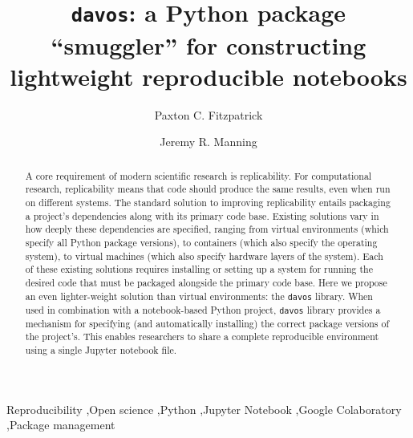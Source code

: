 \documentclass[preprint,12pt, a4paper]{elsarticle}
\begin{document}
\begin{frontmatter}

\title{\texttt{davos}: a Python package ``smuggler'' for constructing
  lightweight reproducible notebooks}
\author{Paxton C. Fitzpatrick}
\author{Jeremy R. Manning}
\address{Department of Psychological and Brain Sciences\\Dartmouth College, Hanover, NH 03755}


\begin{abstract}

A core requirement of modern scientific research is replicability.
For computational research, replicability means that code should
produce the same results, even when run on different systems.  The
standard solution to improving replicability entails packaging a
project's dependencies along with its primary code base.  Existing
solutions vary in how deeply these dependencies are specified, ranging
from virtual environments (which specify all Python package versions),
to containers (which also specify the operating system), to
virtual machines (which also specify hardware layers of the system).
Each of these existing solutions requires installing or setting up a
system for running the desired code that must be packaged alongside
the primary code base.  Here we propose an even lighter-weight
solution than virtual environments: the \texttt{davos} library.  When
used in combination with a notebook-based Python project, \texttt{davos}
library provides a mechanism for specifying (and automatically
installing) the correct package versions of the project's.  This
enables researchers to share a complete reproducible environment using
a single Jupyter notebook file.

\end{abstract}


\begin{keyword}
Reproducibility \sep Open science \sep Python \sep Jupyter Notebook \sep Google Colaboratory \sep Package management
\end{keyword}

\end{frontmatter}


\end{document}

